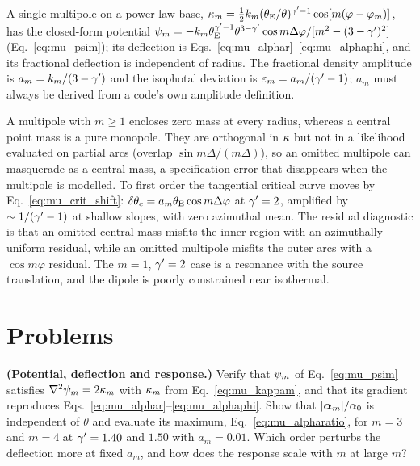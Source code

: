 A single multipole on a power-law base,
$\kappa_m = \tfrac12 k_m(\theta_{\mathrm{E}}/\theta)^{\gamma'-1}
\cos[m(\varphi-\varphi_m)]$, has the closed-form potential
$\psi_m = -k_m\theta_{\mathrm{E}}^{\gamma'-1}\theta^{3-\gamma'}\cos m\Delta\varphi/
[m^2-(3-\gamma')^2]$ (Eq.~\eqref{eq:mu_psim}); its deflection is
Eqs.~\eqref{eq:mu_alphar}--\eqref{eq:mu_alphaphi}, and its fractional
deflection is independent of radius.  The fractional density amplitude
is $a_m = k_m/(3-\gamma')$ and the isophotal deviation is
$\varepsilon_m = a_m/(\gamma'-1)$; $a_m$ must always be derived from a
code's own amplitude definition.

A multipole with $m\ge1$ encloses zero mass at every radius, whereas a
central point mass is a pure monopole.  They are orthogonal in
$\kappa$ but not in a likelihood evaluated on partial arcs (overlap
$\sin m\Delta/(m\Delta)$), so an omitted multipole can masquerade as a
central mass, a specification error that disappears when the multipole
is modelled.  To first order the tangential critical curve moves by
Eq.~\eqref{eq:mu_crit_shift}: $\delta\theta_c = a_m\theta_{\mathrm{E}}\cos
m\Delta\varphi$ at $\gamma'=2$, amplified by $\sim1/(\gamma'-1)$ at shallow
slopes, with zero azimuthal mean.  The residual diagnostic is that an
omitted central mass misfits the inner region with an azimuthally
uniform residual, while an omitted multipole misfits the outer arcs
with a $\cos m\varphi$ residual.  The $m=1$, $\gamma'=2$ case is a
resonance with the source translation, and the dipole is poorly
constrained near isothermal.


\section{Problems}
\label{sec:mu_problems}

\begin{exercise}
\label{ex:mu_potential}
\textbf{(Potential, deflection and response.)}
Verify that $\psi_m$ of Eq.~\eqref{eq:mu_psim} satisfies
$\nabla^2\psi_m = 2\kappa_m$ with $\kappa_m$ from
Eq.~\eqref{eq:mu_kappam}, and that its gradient reproduces
Eqs.~\eqref{eq:mu_alphar}--\eqref{eq:mu_alphaphi}.  Show that
$|\boldsymbol{\alpha}_m|/\alpha_0$ is independent of $\theta$ and evaluate its
maximum, Eq.~\eqref{eq:mu_alpharatio}, for $m=3$ and $m=4$ at
$\gamma'=1.40$ and $1.50$ with $a_m=0.01$.  Which order perturbs the
deflection more at fixed $a_m$, and how does the response scale with
$m$ at large $m$?
\end{exercise}

